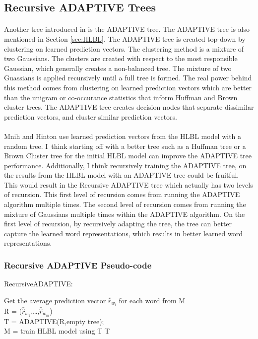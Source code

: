 \subsection{Recursive ADAPTIVE Trees} \label{sec:recursiveADAPTIVETree}
\paragraph{}
Another tree introduced in \cite{MnihHinton2009} is the ADAPTIVE tree. The ADAPTIVE tree is also mentioned in Section \ref{sec:HLBL}. The ADAPTIVE tree is created top-down by clustering on learned prediction vectors. The clustering method is a mixture of two Gaussians. The clusters are created with respect to the most responsible Gaussian, which generally creates a non-balanced tree. The mixture of two Guassians is applied recursively until a full tree is formed. The real power behind this method comes from clustering on learned prediction vectors which are better than the unigram or co-occurance statistics that inform Huffman and Brown cluster trees. The ADAPTIVE tree creates decision nodes that separate dissimilar prediction vectors, and cluster similar prediction vectors. 

\paragraph{}
Mnih and Hinton use learned prediction vectors from the HLBL model with a random tree. I~think starting off with a better tree such as a Huffman tree or a Brown Cluster tree for the initial HLBL model can improve the ADAPTIVE tree performance. Additionally, I think recursively training the ADAPTIVE tree, on the results from the HLBL model with an ADAPTIVE tree could be fruitful. This would result in the Recursive ADAPTIVE tree which actually has two levels of recursion. This first level of recursion comes from running the ADAPTIVE algorithm multiple times. The second level of recursion comes from running the mixture of Gaussians multiple times within the ADAPTIVE algorithm.  On the first level of recursion, by recursively adapting the tree, the tree can better capture the learned word representations, which results in better learned word representations. 
\subsubsection{Recursive ADAPTIVE Pseudo-code}

\begin{algorithm}
\SetAlgoLined
RecursiveADAPTIVE: \\

 {
 	Get the average prediction vector $\bar{\hat{r}}_{w_i}$ for each word from M
 	\\R = ($\bar{\hat{r}}_{w_1}$,\dots,$\bar{\hat{r}}_{w_m}$)
	\\T = ADAPTIVE(R,empty tree);
	\\M = train HLBL model using T
}
\Return T
\end{algorithm}

